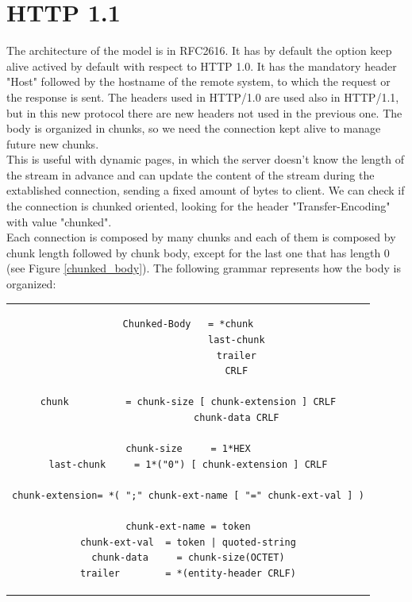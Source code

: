 \section{HTTP 1.1}
The architecture of the model is in RFC2616\cite{RFC2616}. It has by default the option keep alive actived by default with respect to HTTP 1.0. It has the mandatory header "Host" followed by the hostname of the remote system, to which the request or the response is sent. The headers used in HTTP/1.0 are used also in HTTP/1.1, but in this new protocol there are new headers not used in the previous one. The body is organized in chunks, so we need the connection kept alive to manage future new chunks.\\
This is useful with dynamic pages, in which the server doesn't know the length of the stream in advance and can update the content of the stream during the extablished connection, sending a fixed amount of bytes to client. We can check if the connection is chunked oriented, looking for the header "Transfer-Encoding" with value "chunked".\\
Each connection is composed by many chunks and each of them is composed by chunk length followed by chunk body, except for the last one that has length 0 (see Figure \ref{chunked_body}). The following grammar represents how the body is organized:
\begin{center}
\begin{tabular}{c}
\begin{lstlisting}[linewidth=320pt, basicstyle=\footnotesize\sffamily,]
Chunked-Body   = *chunk
                 last-chunk
                 trailer
                 CRLF

chunk          = chunk-size [ chunk-extension ] CRLF
                 chunk-data CRLF

chunk-size     = 1*HEX
last-chunk     = 1*("0") [ chunk-extension ] CRLF

chunk-extension= *( ";" chunk-ext-name [ "=" chunk-ext-val ] )

chunk-ext-name = token
chunk-ext-val  = token | quoted-string
chunk-data     = chunk-size(OCTET)
trailer        = *(entity-header CRLF)
\end{lstlisting}
\end{tabular}
\end{center}

